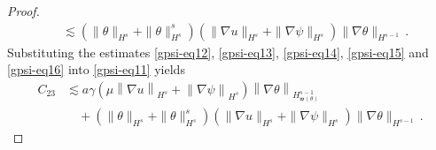 \documentclass[reqno,11pt]{amsart}
\numberwithin{equation}{section}
\def\w{\mathfrak{w}}
\begin{document}
\begin{proof}
\begin{equation}
\begin{aligned}
&\lesssim \left( \|\theta\|_{H^s} + \|\theta\|_{H^s}^s \right) \left( \|\nabla u\|_{H^s} + \|\nabla \psi\|_{H^s} \right) \|\nabla \theta\|_{H^{s-1}} \,.
\end{aligned}
\end{equation}
Substituting the estimates \eqref{gpsi-eq12}, \eqref{gpsi-eq13}, \eqref{gpsi-eq14}, \eqref{gpsi-eq15} and \eqref{gpsi-eq16} into \eqref{gpsi-eq11} yields
\begin{equation}\label{gpsi-eq17}
\begin{aligned}
C_{23} &\lesssim a \gamma \left( \mu \left\| \nabla u \right\|_{H^s} + \left\| \nabla \psi \right\|_{H^s} \right) \left\| \nabla \theta \right\|_{H^{s-1}_{\w (\theta)}} \\
&\quad + \left( \|\theta\|_{H^s} + \|\theta\|_{H^s}^s \right) \left( \|\nabla u\|_{H^s} + \|\nabla \psi\|_{H^s} \right) \|\nabla \theta\|_{H^{s-1}} \,.
\end{aligned}
\end{equation}


\end{proof}
\end{document}

